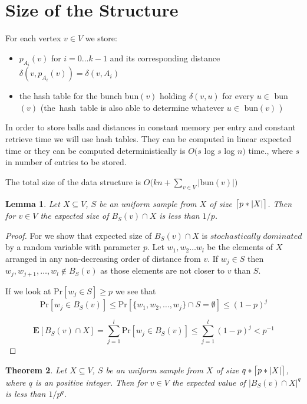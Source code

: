 \documentclass[shortabstract, lic, english]{iithesis}
\theoremstyle{definition} \newtheorem{definition}{Definition}[chapter]
\theoremstyle{remark} \newtheorem{remark}[definition]{Observation}
\theoremstyle{plain} \newtheorem{theorem}[definition]{Theorem}
\theoremstyle{plain} \newtheorem{lemma}[definition]{Lemma}
\theoremstyle{plain} \newtheorem{conjecture}[definition]{Conjecture}
\DeclarePairedDelimiter{\ceil}{\lceil}{\rceil}
\begin{document}
\section{Size of the Structure}

For each vertex $v \in V$ we store:
\begin{itemize}
    \item $p_{A_i}(v)$ for $i=0 \ldots k-1$ and its corresponding distance 
    $\delta(v, p_{A_i}(v)) = \delta(v, A_i)$
    \item the hash table for the bunch bun$(v)$ holding $\delta(v, u)$ for every $u \in $ bun$(v)$
    (the~hash~table is also able to determine whatever $u \in $ bun$(v)$ )
\end{itemize}

In order to store balls and distances in constant memory per entry and constant retrieve time we will use hash tables.
They can be computed in linear expected time\cite{2LevelHashTable} or
they can be computed deterministically is $O(s $ log $ s $ log $ n)$ time.\cite{hashTableDerandomization}, where $s$ in number of entries to be stored.

The total size of the data structure is $O(kn + \sum_{v \in V}|$bun$(v)|)$

\begin{lemma} \label{ballSize}
    Let $X \subseteq V$, $S$ be an uniform sample from $X$ of size $\ceil[\big]{p * |X|}$.
    Then for $v \in V$ the expected size of $B_{S}(v) \cap X$ is less than $1/p$.
\end{lemma}

\begin{proof}
    For we show that expected size of $B_{S}(v) \cap X$ is
    $stochastically$ $dominated$ by a random variable with parameter $p$.
    Let $w_1, w_2 \ldots w_l$ be the elements of $X$ arranged in any non-decreasing order of distance from $v$.
    If $w_j \in S$ then $w_j, w_{j+1}, \ldots , w_l \notin B_{S}(v)$
    as those elements are not closer to $v$ than $S$.

    If we look at Pr$[w_j \in S] \geq p$ we see that 
    $$\text{Pr}[w_j \in B_{S}(v)] \leq
    \text{Pr}[\{w_1, w_2, \ldots, w_j\} \cap S = \emptyset] \leq (1 - p)^j$$
    
    $$\mathbf{E}[B_{S}(v) \cap X] = \sum_{j=1}^{l} \text{Pr}[w_j \in B_{S}(v)] \leq \sum_{j=1}^{l}(1-p)^j < p^{-1}$$
\end{proof}

\begin{theorem} \label{ballSizeStrong}
    Let $X \subseteq V$, $S$ be an uniform sample from $X$ of size $q*\ceil[\big]{p * |X|}$, where $q$ is an positive integer.
    Then for $v \in V$ the expected value of $|B_{S}(v) \cap X|^q$ is less than $1/p^q$.
\end{theorem}
\end{document}
